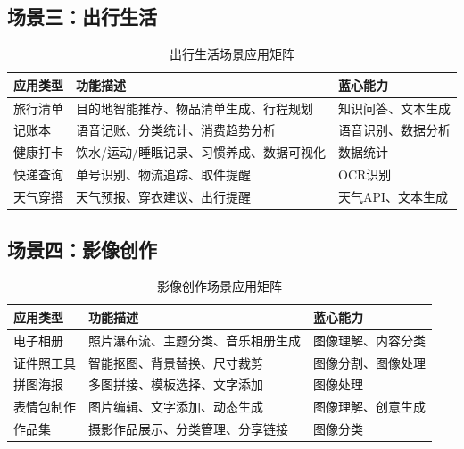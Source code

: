 \documentclass[a4paper,12pt]{ctexart}
\begin{document}
\subsection{场景三：出行生活}

\begin{table}[H]
    \centering
    \caption{出行生活场景应用矩阵}
    \begin{tabularx}{\textwidth}{|l|X|l|}
        \hline
        \textbf{应用类型} & \textbf{功能描述} & \textbf{蓝心能力} \\
        \hline
        旅行清单 & 目的地智能推荐、物品清单生成、行程规划 & 知识问答、文本生成 \\
        \hline
        记账本 & 语音记账、分类统计、消费趋势分析 & 语音识别、数据分析 \\
        \hline
        健康打卡 & 饮水/运动/睡眠记录、习惯养成、数据可视化 & 数据统计 \\
        \hline
        快递查询 & 单号识别、物流追踪、取件提醒 & OCR识别 \\
        \hline
        天气穿搭 & 天气预报、穿衣建议、出行提醒 & 天气API、文本生成 \\
        \hline
    \end{tabularx}
\end{table}

\subsection{场景四：影像创作}

\begin{table}[H]
    \centering
    \caption{影像创作场景应用矩阵}
    \begin{tabularx}{\textwidth}{|l|X|l|}
        \hline
        \textbf{应用类型} & \textbf{功能描述} & \textbf{蓝心能力} \\
        \hline
        电子相册 & 照片瀑布流、主题分类、音乐相册生成 & 图像理解、内容分类 \\
        \hline
        证件照工具 & 智能抠图、背景替换、尺寸裁剪 & 图像分割、图像处理 \\
        \hline
        拼图海报 & 多图拼接、模板选择、文字添加 & 图像处理 \\
        \hline
        表情包制作 & 图片编辑、文字添加、动态生成 & 图像理解、创意生成 \\
        \hline
        作品集 & 摄影作品展示、分类管理、分享链接 & 图像分类 \\
        \hline
    \end{tabularx}
\end{table}
\end{document}
